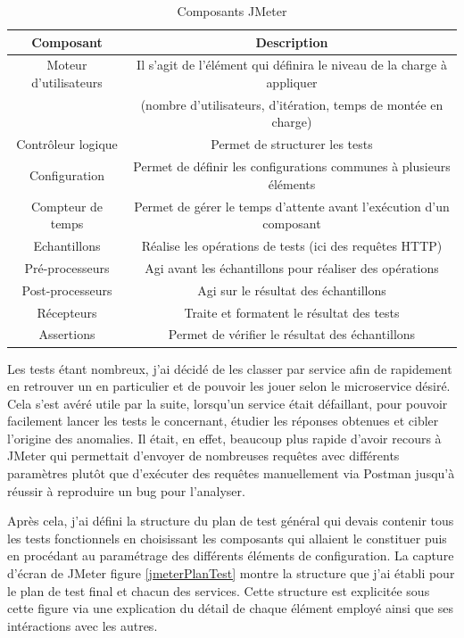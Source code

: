 \begin{table}[h!]
	\center
	\begin{tabular}{| c | c |}
     \hline
     Composant & Description \\ \hline
     Moteur d’utilisateurs & Il s’agit de l’élément qui définira le niveau de la charge à appliquer \\ & (nombre d’utilisateurs, d’itération, temps de montée en charge) \\ \hline
     Contrôleur logique & Permet de structurer les tests \\ \hline
     Configuration & Permet de définir les configurations communes à plusieurs éléments \\ \hline
     Compteur de temps & Permet de gérer le temps d’attente avant l’exécution d’un composant \\ \hline
     Echantillons & Réalise les opérations de tests (ici des requêtes HTTP) \\ \hline
     Pré-processeurs & Agi avant les échantillons pour réaliser des opérations \\ \hline
     Post-processeurs & Agi sur le résultat des échantillons \\ \hline
     Récepteurs & Traite et formatent le résultat des tests \\ \hline
     Assertions & Permet de vérifier le résultat des échantillons \\ \hline
	\end{tabular}
	\caption{Composants JMeter}
	\label{composantJMeter}
\end{table}
	
	Les tests étant nombreux, j’ai décidé de les classer par service afin de rapidement en retrouver un en particulier et de pouvoir les jouer selon le microservice désiré. Cela s'est avéré utile par la suite, lorsqu'un service était défaillant, pour pouvoir facilement lancer les tests le concernant, étudier les réponses obtenues et cibler l'origine des anomalies. Il était, en effet, beaucoup plus rapide d'avoir recours à JMeter qui permettait d'envoyer de nombreuses requêtes avec différents paramètres plutôt que d'exécuter des requêtes manuellement via Postman jusqu'à réussir à reproduire un bug pour l'analyser. 
	
	Après cela, j’ai défini la structure du plan de test général qui devais contenir tous les tests fonctionnels en choisissant les composants qui allaient le constituer puis en procédant au paramétrage des différents éléments de configuration. La capture d’écran de JMeter figure \ref{jmeterPlanTest} montre la structure que j’ai établi pour le plan de test final et chacun des services. Cette structure est explicitée sous cette figure via une explication du détail de chaque élément employé ainsi que ses intéractions avec les autres. \\
	
